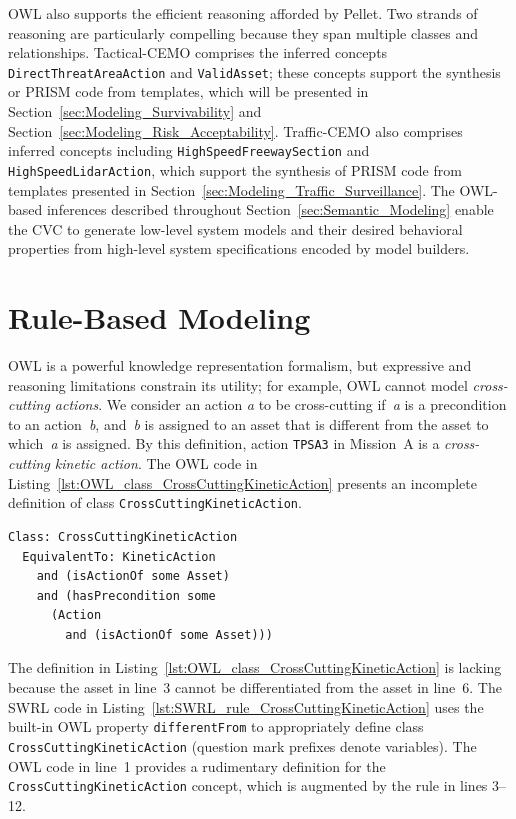 OWL also supports the efficient reasoning afforded by Pellet. Two strands of reasoning are particularly compelling because they span multiple classes and relationships. Tactical-CEMO comprises the inferred concepts \texttt{DirectThreatAreaAction} and \texttt{ValidAsset}; these concepts support the synthesis or PRISM code from templates, which will be presented in Section~\ref{sec:Modeling_Survivability} and Section~\ref{sec:Modeling_Risk_Acceptability}. Traffic-CEMO also comprises inferred concepts including \texttt{HighSpeedFreewaySection} and \texttt{HighSpeedLidarAction}, which support the synthesis of PRISM code from templates presented in Section~\ref{sec:Modeling_Traffic_Surveillance}. The OWL-based inferences described throughout Section~\ref{sec:Semantic_Modeling} enable the CVC to generate low-level system models and their desired behavioral properties from high-level system specifications encoded by model builders.

\section{Rule-Based Modeling}
\label{sec:Rule_Based_Modeling}

OWL is a powerful knowledge representation formalism, but expressive and reasoning limitations constrain its utility; for example, OWL cannot model \emph{cross-cutting actions}. We consider an action \emph{a} to be cross-cutting if~\emph{a} is a precondition to an action~\emph{b}, and~\emph{b} is assigned to an asset that is different from the asset to which~\emph{a} is assigned. By this definition, action \texttt{TPSA3} in Mission~A is a \emph{cross-cutting kinetic action}. The OWL code in Listing~\ref{lst:OWL_class_CrossCuttingKineticAction} presents an incomplete definition of class \texttt{CrossCuttingKineticAction}.

\begin{lstlisting}[caption={OWL code for class \texttt{CrossCuttingKineticAction}},label=lst:OWL_class_CrossCuttingKineticAction]
Class: CrossCuttingKineticAction
  EquivalentTo: KineticAction
    and (isActionOf some Asset)
    and (hasPrecondition some
      (Action
        and (isActionOf some Asset)))
\end{lstlisting}

The definition in Listing~\ref{lst:OWL_class_CrossCuttingKineticAction} is lacking because the asset in line~3 cannot be differentiated from the asset in line~6. The SWRL code in Listing~\ref{lst:SWRL_rule_CrossCuttingKineticAction} uses the built-in OWL property \texttt{differentFrom} to appropriately define class \texttt{CrossCuttingKineticAction} (question mark prefixes denote variables). The OWL code in line~1 provides a rudimentary definition for the \texttt{CrossCuttingKineticAction} concept, which is augmented by the rule in lines 3--12.

